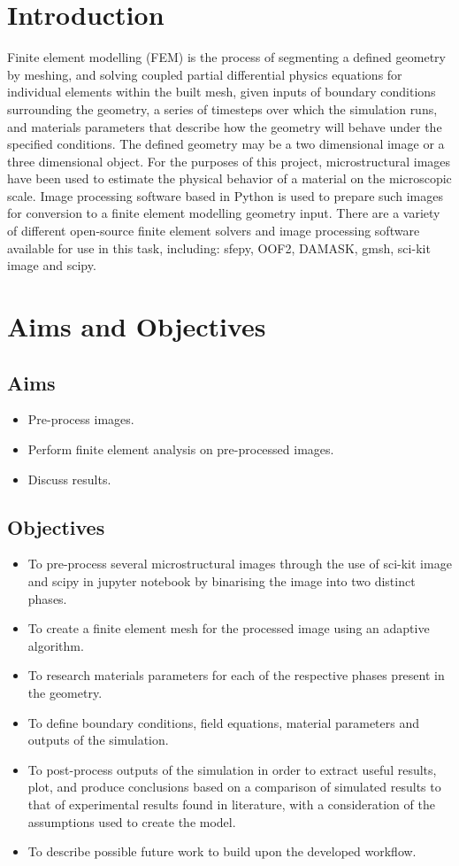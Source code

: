 \documentclass[\report.tex]{subfiles}
\begin{document}
\section{Introduction}
Finite element modelling (FEM) is the process of segmenting a defined geometry by meshing, and solving coupled partial differential physics equations for individual elements within the built mesh, given inputs of boundary conditions surrounding the geometry, a series of timesteps over which the simulation runs, and materials parameters that describe how the geometry will behave under the specified conditions. The defined geometry may be a two dimensional image or a three dimensional object. For the purposes of this project, microstructural images have been used to estimate the physical behavior of a material on the microscopic scale. Image processing software based in Python is used to prepare such images for conversion to a finite element modelling geometry input. There are a variety of different open-source finite element solvers and image processing software available for use in this task, including: sfepy, OOF2, DAMASK, gmsh, sci-kit image and scipy.

\section{Aims and Objectives}
\subsection{Aims}

\begin{itemize}
  \item Pre-process images.
  \item Perform finite element analysis on pre-processed images.
  \item Discuss results.
\end{itemize}

\subsection{Objectives}

\begin{itemize}
  \item To pre-process several microstructural images through the use of sci-kit image and scipy in jupyter notebook by binarising the image into two distinct phases.
  \item To create a finite element mesh for the processed image using an adaptive algorithm.
  \item To research materials parameters for each of the respective phases present in the geometry.
  \item To define boundary conditions, field equations, material parameters and outputs of the simulation.
  \item To post-process outputs of the simulation in order to extract useful results, plot, and produce conclusions based on a comparison of simulated results to that of experimental results found in literature, with a consideration of the assumptions used to create the model.
  \item To describe possible future work to build upon the developed workflow.
\end{itemize}
\end{document}
